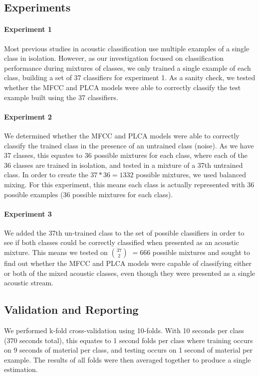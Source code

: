 \documentclass[a4paper,10pt,final]{ThesisStyle}
\begin{document}
\subsection{Experiments}

\paragraph{Experiment 1}
Most previous studies in acoustic classification use multiple examples of a single class in isolation.  However, as our investigation focused on classification performance during mixtures of classes, we only trained a single example of each class, building a set of 37 classifiers for experiment 1.  As a sanity check, we tested whether the MFCC and PLCA models were able to correctly classify the test example built using the 37 classifiers.

\paragraph{Experiment 2}
We determined whether the MFCC and PLCA models were able to correctly classify the trained class in the presence of an untrained class (noise).  As we have 37 classes, this equates to 36 possible mixtures for each class, where each of the 36 classes are trained in isolation, and tested in a mixture of a 37th untrained class.  In order to create the $37*36 = 1332$ possible mixtures, we used balanced mixing.  For this experiment, this means each class is actually represented with 36 possible examples (36 possible mixtures for each class).  

\paragraph{Experiment 3}
We added the 37th un-trained class to the set of possible classifiers in order to see if both classes could be correctly classified when presented as an acoustic mixture.  This means we tested on $37\choose2$ $= 666$ possible mixtures and sought to find out whether the MFCC and PLCA models were capable of classifying either or both of the mixed acoustic classes, even though they were presented as a single acoustic stream.

\subsection{Validation and Reporting}
\label{sec:ROC}
We performed k-fold cross-validation using 10-folds.  With 10 seconds per class (370 seconds total), this equates to 1 second folds per class where training occurs on 9 seconds of material per class, and testing occurs on 1 second of material per example. The results of all folds were then averaged together to produce a single estimation.
\end{document}
